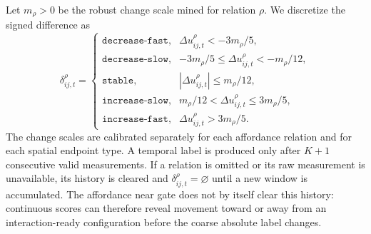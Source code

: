 Let \(m_{\rho}>0\) be the robust change scale mined for relation \(\rho\).
We discretize the signed difference as
\begin{equation}
\delta_{ij,t}^{\rho}
=
\begin{cases}
\texttt{decrease-fast},
& \Delta u_{ij,t}^{\rho}< -3m_{\rho}/5,\\
\texttt{decrease-slow},
& -3m_{\rho}/5\le\Delta u_{ij,t}^{\rho}< -m_{\rho}/12,\\
\texttt{stable},
& |\Delta u_{ij,t}^{\rho}|\le m_{\rho}/12,\\
\texttt{increase-slow},
& m_{\rho}/12<\Delta u_{ij,t}^{\rho}\le 3m_{\rho}/5,\\
\texttt{increase-fast},
& \Delta u_{ij,t}^{\rho}>3m_{\rho}/5.
\end{cases}
\label{eq:temporal_bins}
\end{equation}
The change scales are calibrated separately for each affordance relation and
for each spatial endpoint type. A temporal label is produced only after
\(K+1\) consecutive valid measurements. If a relation is omitted or its raw
measurement is unavailable, its history is cleared and
\(\delta_{ij,t}^{\rho}=\varnothing\) until a new window is accumulated. The
affordance near gate does not by itself clear this history: continuous scores
can therefore reveal movement toward or away from an interaction-ready
configuration before the coarse absolute label changes.
